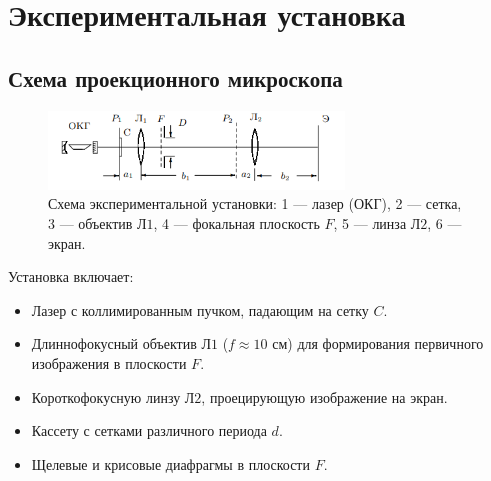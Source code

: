 \section*{Экспериментальная установка}

\subsection*{Схема проекционного микроскопа}
\begin{figure}[H]
    \centering
    \includegraphics[width=0.7\textwidth]{images/fig3.png}
    \caption{Схема экспериментальной установки: 1 --- лазер (ОКГ), 2 --- сетка, 3 --- объектив \( Л1 \), 4 --- фокальная плоскость \( F \), 5 --- линза \( Л2 \), 6 --- экран.}
    \label{fig:setup}
\end{figure}

Установка включает:
\begin{itemize}
    \item Лазер с коллимированным пучком, падающим на сетку \( C \).
    \item Длиннофокусный объектив \( Л1 \) (\( f \approx 10 \) см) для формирования первичного изображения в плоскости \( F \).
    \item Короткофокусную линзу \( Л2 \), проецирующую изображение на экран.
    \item Кассету с сетками различного периода \( d \).
    \item Щелевые и крисовые диафрагмы в плоскости \( F \).
\end{itemize}

